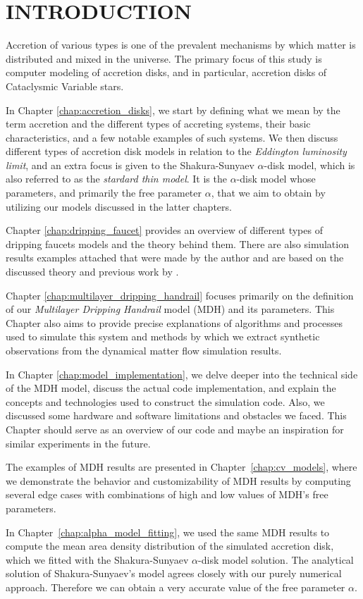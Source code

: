 \chapter{INTRODUCTION}
\thispagestyle{empty}


Accretion of various types is one of the prevalent mechanisms by which matter is distributed and mixed in the universe. The primary focus of this study is computer modeling of accretion disks, and in particular, accretion disks of Cataclysmic Variable stars.

In Chapter \ref{chap:accretion_disks}, we start by defining what we mean by the term accretion and the different types of accreting systems, their basic characteristics, and a few notable examples of such systems. We then discuss different types of accretion disk models in relation to the \emph{Eddington luminosity limit}, and an extra focus is given to the Shakura-Sunyaev $\alpha$-disk model, which is also referred to as the \emph{stardard thin model}. It is the $\alpha$-disk model whose parameters, and primarily the free parameter $\alpha$, that we aim to obtain by utilizing our models discussed in the latter chapters.

Chapter \ref{chap:dripping_faucet} provides an overview of different types of dripping faucets models and the theory behind them. There are also simulation results examples attached that were made by the author and are based on the discussed theory and previous work by \citep{kveton2014}.

Chapter \ref{chap:multilayer_dripping_handrail} focuses primarily on the definition of our \emph{Multilayer Dripping Handrail} model (MDH) and its parameters. This Chapter also aims to provide precise explanations of algorithms and processes used to simulate this system and methods by which we extract synthetic observations from the dynamical matter flow simulation results.

In Chapter \ref{chap:model_implementation}, we delve deeper into the technical side of the MDH model, discuss the actual code implementation, and explain the concepts and technologies used to construct the simulation code. Also, we discussed some hardware and software limitations and obstacles we faced. This Chapter should serve as an overview of our code and maybe an inspiration for similar experiments in the future.

The examples of MDH results are presented in Chapter~\ref{chap:cv_models}, where we demonstrate the behavior and customizability of MDH results by computing several edge cases with combinations of high and low values of MDH's free parameters. 

In Chapter~\ref{chap:alpha_model_fitting}, we used the same MDH results to compute the mean area density distribution of the simulated accretion disk, which we fitted with the Shakura-Sunyaev $\alpha$-disk model solution. The analytical solution of Shakura-Sunyaev's model agrees closely with our purely numerical approach. Therefore we can obtain a very accurate value of the free parameter $\alpha$.
